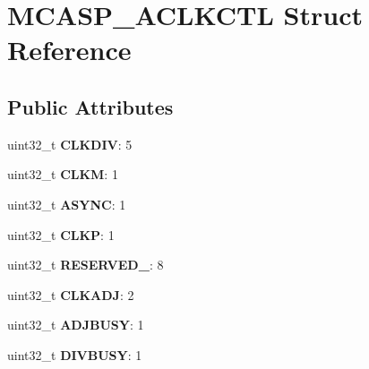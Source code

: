 \hypertarget{structMCASP__ACLKCTL}{\section{M\-C\-A\-S\-P\-\_\-\-A\-C\-L\-K\-C\-T\-L Struct Reference}
\label{structMCASP__ACLKCTL}
}
\subsection*{Public Attributes}
\begin{DoxyCompactItemize}
\item 
\hypertarget{structMCASP__ACLKCTL_a4be595af18a3396c3899641d0753db70}{uint32\-\_\-t {\bfseries C\-L\-K\-D\-I\-V}\-: 5}\label{structMCASP__ACLKCTL_a4be595af18a3396c3899641d0753db70}

\item 
\hypertarget{structMCASP__ACLKCTL_a65bf432636fad9b743447d3c0a6e2555}{uint32\-\_\-t {\bfseries C\-L\-K\-M}\-: 1}\label{structMCASP__ACLKCTL_a65bf432636fad9b743447d3c0a6e2555}

\item 
\hypertarget{structMCASP__ACLKCTL_a59d5b9871476d62af9336db352e95602}{uint32\-\_\-t {\bfseries A\-S\-Y\-N\-C}\-: 1}\label{structMCASP__ACLKCTL_a59d5b9871476d62af9336db352e95602}

\item 
\hypertarget{structMCASP__ACLKCTL_a0eaa1956b22ced671d7377891e27b62b}{uint32\-\_\-t {\bfseries C\-L\-K\-P}\-: 1}\label{structMCASP__ACLKCTL_a0eaa1956b22ced671d7377891e27b62b}

\item 
\hypertarget{structMCASP__ACLKCTL_aebc138177a8cd29a7b918eb6a8d9a0ba}{uint32\-\_\-t {\bfseries R\-E\-S\-E\-R\-V\-E\-D\-\_}\-: 8}\label{structMCASP__ACLKCTL_aebc138177a8cd29a7b918eb6a8d9a0ba}

\item 
\hypertarget{structMCASP__ACLKCTL_a28aa028d0ed125a8d9e68dc4e20af72d}{uint32\-\_\-t {\bfseries C\-L\-K\-A\-D\-J}\-: 2}\label{structMCASP__ACLKCTL_a28aa028d0ed125a8d9e68dc4e20af72d}

\item 
\hypertarget{structMCASP__ACLKCTL_ada5acf47db4f649521dbc02335661d22}{uint32\-\_\-t {\bfseries A\-D\-J\-B\-U\-S\-Y}\-: 1}\label{structMCASP__ACLKCTL_ada5acf47db4f649521dbc02335661d22}

\item 
\hypertarget{structMCASP__ACLKCTL_a25fe90e6063a15e9c50ce1329ccfa0e4}{uint32\-\_\-t {\bfseries D\-I\-V\-B\-U\-S\-Y}\-: 1}\label{structMCASP__ACLKCTL_a25fe90e6063a15e9c50ce1329ccfa0e4}


\end{DoxyCompactItemize}
